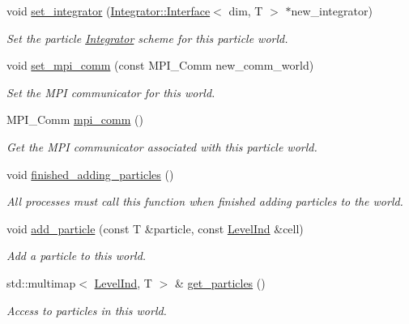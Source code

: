 \begin{DoxyCompactItemize}
void \hyperlink{classps__mmm_1_1_particle_1_1_world_a8691db977a9abb4065a2ada2eb3e7564}{set\+\_\+integrator} (\hyperlink{classps__mmm_1_1_particle_1_1_integrator_1_1_interface}{Integrator\+::\+Interface}$<$ dim, T $>$ $\ast$new\+\_\+integrator)
\begin{DoxyCompactList}\small\item\em Set the particle \hyperlink{namespaceps__mmm_1_1_particle_1_1_integrator}{Integrator} scheme for this particle world. \end{DoxyCompactList}\item 
void \hyperlink{classps__mmm_1_1_particle_1_1_world_ae43fddb56235b7800829fd13784a898a}{set\+\_\+mpi\+\_\+comm} (const M\+P\+I\+\_\+\+Comm new\+\_\+comm\+\_\+world)
\begin{DoxyCompactList}\small\item\em Set the M\+P\+I communicator for this world. \end{DoxyCompactList}\item 
M\+P\+I\+\_\+\+Comm \hyperlink{classps__mmm_1_1_particle_1_1_world_a6800e7acbb19148a3dc64665497b2753}{mpi\+\_\+comm} ()
\begin{DoxyCompactList}\small\item\em Get the M\+P\+I communicator associated with this particle world. \end{DoxyCompactList}\item 
void \hyperlink{classps__mmm_1_1_particle_1_1_world_ac6b5165bb1cdff3106b7e1f1a5822bfd}{finished\+\_\+adding\+\_\+particles} ()
\begin{DoxyCompactList}\small\item\em All processes must call this function when finished adding particles to the world. \end{DoxyCompactList}\item 
void \hyperlink{classps__mmm_1_1_particle_1_1_world_a85e0fa133b26216193d45d988aacb9f9}{add\+\_\+particle} (const T \&particle, const \hyperlink{namespaceps__mmm_1_1_particle_a475174140997ceb63cc9e801b6c0c4b8}{Level\+Ind} \&cell)
\begin{DoxyCompactList}\small\item\em Add a particle to this world. \end{DoxyCompactList}\item 
std\+::multimap$<$ \hyperlink{namespaceps__mmm_1_1_particle_a475174140997ceb63cc9e801b6c0c4b8}{Level\+Ind}, T $>$ \& \hyperlink{classps__mmm_1_1_particle_1_1_world_a5d6070289c4f84978f4577dfafc1bbd1}{get\+\_\+particles} ()
\begin{DoxyCompactList}\small\item\em Access to particles in this world. \end{DoxyCompactList}\item 

\end{DoxyCompactItemize}
